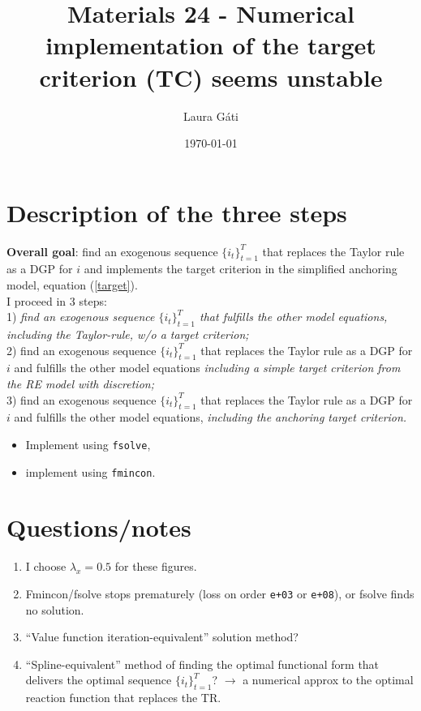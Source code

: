 \documentclass[11pt]{article}
\renewcommand{\[}{\begin{equation}}
\renewcommand{\]}{\end{equation}}
\begin{document}
\linespread{1.0}

\title{Materials 24 - Numerical implementation of the target criterion (TC) seems unstable}
\author{Laura G\'ati} 
\date{\today}
\maketitle


\tableofcontents


\newpage
\section{Description of the three steps}
\textbf{Overall goal}: find an exogenous sequence $\{i_t\}_{t=1}^{T}$ that replaces the Taylor rule as a DGP for $i$ and implements the target criterion in the simplified anchoring model, equation (\ref{target}).\\
I proceed in 3 steps: \\
1) \emph{find an exogenous sequence $\{i_t\}_{t=1}^{T}$ that fulfills the other model equations, including the Taylor-rule, w/o a target criterion;} \\
2) find an exogenous sequence $\{i_t\}_{t=1}^{T}$ that replaces the Taylor rule as a DGP for $i$ and fulfills the other model equations \emph{including a simple target criterion from the RE model with discretion;} \\
3) find an exogenous sequence $\{i_t\}_{t=1}^{T}$ that replaces the Taylor rule as a DGP for $i$ and fulfills the other model equations, \emph{including the anchoring target criterion.} \\
\begin{itemize}
\item Implement using \texttt{fsolve},
\item implement using \texttt{fmincon}.
\end{itemize}


\section{Questions/notes}
\begin{enumerate}
\item I choose $\lambda_x = 0.5$ for these figures.
\item Fmincon/fsolve stops prematurely (loss on order \texttt{e+03} or \texttt{e+08}), or fsolve finds no solution.
\item ``Value function iteration-equivalent'' solution method?
\item ``Spline-equivalent'' method of finding the optimal functional form that delivers the optimal sequence $\{i_t\}_{t=1}^T$? $\rightarrow$ a numerical approx to the optimal reaction function that replaces the TR.
\end{enumerate}
\end{document}
